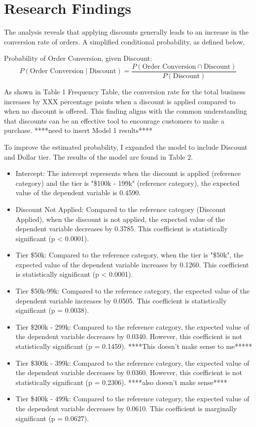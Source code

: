 \documentclass[12pt,english]{article}
\begin{document}
\section{Research Findings}

The analysis reveals that applying discounts generally leads to an increase in the conversion rate of orders. A simplified conditional probability, as defined below, 

Probability of Order Conversion, given Discount:
\begin{equation}
P(\text{Order Conversion} \mid \text{Discount}) = \frac{P(\text{Order Conversion} \cap \text{Discount})}{P(\text{Discount})}
\end{equation}

As shown in Table 1 Frequency Table, the conversion rate for the total business increases by XXX percentage points when a discount is applied compared to when no discount is offered. This finding aligns with the common understanding that discounts can be an effective tool to encourage customers to make a purchase.
****need to insert Model 1 results****

To improve the estimated probability, I expanded the model to include Discount and Dollar tier.
The results of the model are found in Table 2. 
    \begin{itemize}
        \item Intercept: The intercept represents when the discount is applied (reference category) and the tier is "\$100k - 199k" (reference category), the expected value of the dependent variable is 0.4590.
        \item Discount Not Applied: Compared to the reference category (Discount Applied), when the discount is not applied, the expected value of the dependent variable decreases by 0.3785. This coefficient is statistically significant (p < 0.0001).
        \item Tier \<\$50k: Compared to the reference category, when the tier is "\<\$50k", the expected value of the dependent variable increases by 0.1260. This coefficient is statistically significant (p < 0.0001).
        \item Tier \$50k-99k: Compared to the reference category, the expected value of the dependent variable increases by 0.0505. This coefficient is statistically significant (p = 0.0038).
        \item Tier \$200k - 299k: Compared to the reference category, the expected value of the dependent variable decreases by 0.0340. However, this coefficient is not statistically significant (p = 0.1459). ****This doesn't make sense to me*****
        \item Tier \$300k - 399k: Compared to the reference category, the expected value of the dependent variable decreases by 0.0360. However, this coefficient is not statistically significant (p = 0.2306). ****also doesn't make sense****
        \item Tier \$400k - 499k: Compared to the reference category, the expected value of the dependent variable decreases by 0.0610. This coefficient is marginally significant (p = 0.0627).
    \end{itemize}
\end{document}
